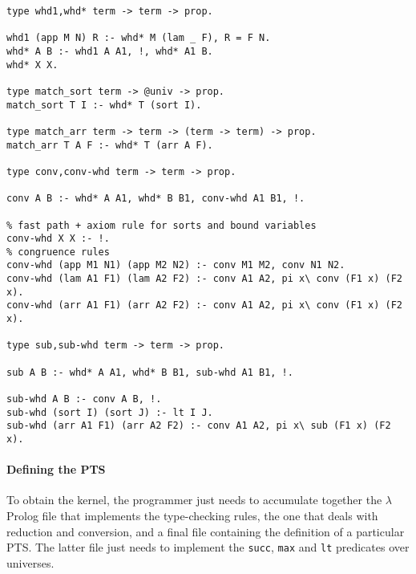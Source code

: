 \documentclass{easychair}
\begin{document}
\begin{Verbatim}
type whd1,whd* term -> term -> prop.

whd1 (app M N) R :- whd* M (lam _ F), R = F N.
whd* A B :- whd1 A A1, !, whd* A1 B.
whd* X X.

type match_sort term -> @univ -> prop.
match_sort T I :- whd* T (sort I).

type match_arr term -> term -> (term -> term) -> prop.
match_arr T A F :- whd* T (arr A F).

type conv,conv-whd term -> term -> prop.

conv A B :- whd* A A1, whd* B B1, conv-whd A1 B1, !.

% fast path + axiom rule for sorts and bound variables
conv-whd X X :- !.
% congruence rules
conv-whd (app M1 N1) (app M2 N2) :- conv M1 M2, conv N1 N2.
conv-whd (lam A1 F1) (lam A2 F2) :- conv A1 A2, pi x\ conv (F1 x) (F2 x).
conv-whd (arr A1 F1) (arr A2 F2) :- conv A1 A2, pi x\ conv (F1 x) (F2 x).

type sub,sub-whd term -> term -> prop.

sub A B :- whd* A A1, whd* B B1, sub-whd A1 B1, !.

sub-whd A B :- conv A B, !.
sub-whd (sort I) (sort J) :- lt I J.
sub-whd (arr A1 F1) (arr A2 F2) :- conv A1 A2, pi x\ sub (F1 x) (F2 x).
\end{Verbatim}



\paragraph{Defining the PTS}\label{sec:eccpts}
To obtain the kernel, the programmer just needs to accumulate together the $\lambda$Prolog file that implements the type-checking rules, the one that deals with reduction and conversion, and a final file containing the definition of a particular PTS. The latter file just needs to implement the \verb+succ+, \verb+max+ and \verb+lt+ predicates over universes.
\end{document}
